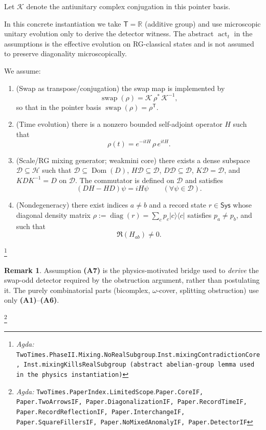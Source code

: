 \documentclass{article}
\newcommand{\Sys}{\mathsf{Sys}}
\newcommand{\Time}{\mathsf{T}}
\newcommand{\diag}{\operatorname{diag}}
\newcommand{\swap}{\operatorname{swap}}
\newcommand{\actT}{\operatorname{act}_t}
\newcommand{\Agda}[1]{\texttt{#1}}
\newcommand{\AgdaRef}[2]{\emph{Agda: }\Agda{#1}.\Agda{#2}}
\newcommand{\AgdaNote}[2]{\footnote{\AgdaRef{#1}{#2}}}
\theoremstyle{definition}
\newtheorem{remark}{Remark}[section]
\theoremstyle{plain}
\begin{document}
\begin{enumerate}[label=\textbf{(A\arabic*)},leftmargin=*,itemsep=0.6em]
\medskip
\noindent
Let $\mathcal K$ denote the antiunitary complex conjugation in this pointer basis.

In this concrete instantiation we take $\Time=\mathbb R$ (additive group) and
use microscopic unitary evolution only to derive the detector witness. The
abstract $\actT$ in the assumptions is the effective evolution on RG-classical
states and is not assumed to preserve diagonality microscopically.

We assume:
\begin{enumerate}[label=\textbf{(A7.\alph*)},leftmargin=*,itemsep=0.4em]
\item (Swap as transpose/conjugation) the swap map is implemented by
\[\swap(\rho)=\mathcal K\,\rho^{\ast}\,\mathcal K^{-1},\]
so that in the pointer basis $\swap(\rho)=\rho^{\mathsf T}$.

\item (Time evolution) there is a nonzero bounded self-adjoint operator $H$ such that
\[\rho(t)=e^{-itH}\,\rho\,e^{itH}.\]

\item (Scale/RG mixing generator; weakmini core) there exists a dense subspace
$\mathcal D\subseteq\mathcal H$ such that $\mathcal D\subseteq\operatorname{Dom}(D)$,
$H\mathcal D\subseteq\mathcal D$, $D\mathcal D\subseteq\mathcal D$, $K\mathcal D=\mathcal D$,
and $KDK^{-1}=D$ on $\mathcal D$. The commutator is defined on $\mathcal D$ and satisfies
\begin{equation}
  (DH-HD)\psi=iH\psi \qquad (\forall\psi\in\mathcal D).
  \label{eq:mixing-comm}
\end{equation}

\item (Nondegeneracy) there exist indices $a\ne b$ and a record state $r\in\Sys$
whose diagonal density matrix $\rho:=\diag(r)=\sum_c p_c\lvert c\rangle\langle c\rvert$
satisfies $p_a\ne p_b$, and such that
\begin{equation}
  \Re(H_{ab})\ne 0.
  \label{eq:nondeg}
\end{equation}
\end{enumerate}
\AgdaNote{TwoTimes.PhaseII.Mixing.NoRealSubgroup}{Inst.mixingContradictionCore, Inst.mixingKillsRealSubgroup (abstract abelian-group lemma used in the physics instantiation)}
\end{enumerate}

\begin{remark}
\label{rem:limited-scope-theorem-translation-002}
Assumption \textbf{(A7)} is the physics-motivated bridge used to \emph{derive} the
swap-odd detector required by the obstruction argument, rather than postulating it.
The purely combinatorial parts (bicomplex, $\omega$-cover, splitting obstruction)
use only \textbf{(A1)}--\textbf{(A6)}.
\end{remark}
\AgdaNote{TwoTimes.PaperIndex.LimitedScope}{Paper.CoreIF, Paper.TwoArrowsIF, Paper.DiagonalizationIF, Paper.RecordTimeIF, Paper.RecordReflectionIF, Paper.InterchangeIF, Paper.SquareFillersIF, Paper.NoMixedAnomalyIF, Paper.DetectorIF}
\end{document}
